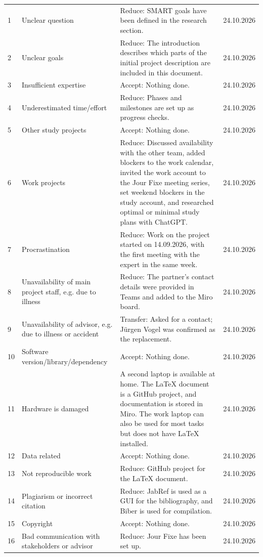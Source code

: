 \begin{longtable}{@{}C{1cm}L{3.5cm}L{9cm}C{2.5cm}@{}}
1 & Unclear question & Reduce: SMART goals have been defined in the research section. & 24.10.2026 \\
2 & Unclear goals & Reduce: The introduction describes which parts of the initial project description are included in this document. & 24.10.2026 \\
3 & Insufficient expertise & Accept: Nothing done. & 24.10.2026 \\
4 & Underestimated time/effort & Reduce: Phases and milestones are set up as progress checks. & 24.10.2026 \\
5 & Other study projects & Accept: Nothing done. & 24.10.2026 \\
6 & Work projects & Reduce: Discussed availability with the other team, added blockers to the work calendar, invited the work account to the Jour Fixe meeting series, set weekend blockers in the study account, and researched optimal or minimal study plans with ChatGPT. & 24.10.2026 \\
7 & Procrastination & Reduce: Work on the project started on 14.09.2026, with the first meeting with the expert in the same week. & 24.10.2026 \\
8 & Unavailability of main project staff, e.g. due to illness & Reduce: The partner's contact details were provided in Teams and added to the Miro board. & 24.10.2026 \\
9 & Unavailability of advisor, e.g. due to illness or accident & Transfer: Asked for a contact; Jürgen Vogel was confirmed as the replacement. & 24.10.2026 \\
10 & Software version/library/dependency & Accept: Nothing done. & 24.10.2026 \\
11 & Hardware is damaged & A second laptop is available at home. The LaTeX document is a GitHub project, and documentation is stored in Miro. The work laptop can also be used for most tasks but does not have LaTeX installed. & 24.10.2026 \\
12 & Data related & Accept: Nothing done. & 24.10.2026 \\
13 & Not reproducible work & Reduce: GitHub project for the LaTeX document. & 24.10.2026 \\
14 & Plagiarism or incorrect citation & Reduce: JabRef is used as a GUI for the bibliography, and Biber is used for compilation. & 24.10.2026 \\
15 & Copyright & Accept: Nothing done. & 24.10.2026 \\
16 & Bad communication with stakeholders or advisor & Reduce: Jour Fixe has been set up. & 24.10.2026 \\

\end{longtable}
